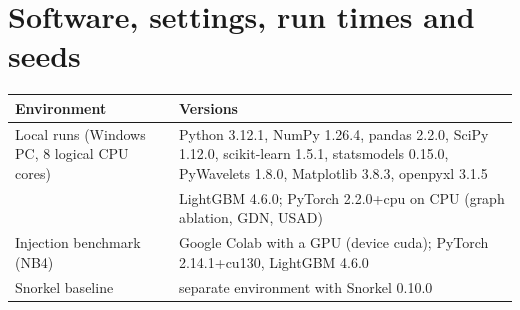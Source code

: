 \documentclass[11pt,a4paper]{article}
\makeatletter
\newenvironment{stable}{\par\addvspace{8pt}\noindent\begin{minipage}{\textwidth}\def\@captype{table}\centering}{\end{minipage}\par\addvspace{8pt}}
\makeatother
\begin{document}
\section{Software, settings, run times and seeds}\label{sec:s-repro}
\begin{stable}
\caption{Software and hardware. The versions of the local environment were read on 15 November 2026; each run records the versions it used in its \texttt{summary.json}. LightGBM is pinned at 4.6.0 (4.7.0 crashed on the local machine).}\label{tab:s-software}
\footnotesize\setlength{\tabcolsep}{4pt}
\begin{tabular}{@{}>{\raggedright\arraybackslash}p{4.6cm} >{\raggedright\arraybackslash}p{10.6cm}@{}}
\toprule
Environment & Versions \\
\midrule
Local runs (Windows PC, 8 logical CPU cores) & Python 3.12.1, NumPy 1.26.4, pandas 2.2.0, SciPy 1.12.0, scikit-learn 1.5.1, statsmodels 0.15.0, PyWavelets 1.8.0, Matplotlib 3.8.3, openpyxl 3.1.5 \\
 & LightGBM 4.6.0; PyTorch 2.2.0+cpu on CPU (graph ablation, GDN, USAD) \\
Injection benchmark (NB4) & Google Colab with a GPU (device cuda); PyTorch 2.14.1+cu130, LightGBM 4.6.0 \\
Snorkel baseline & separate environment with Snorkel 0.10.0 \\
\bottomrule
\end{tabular}
\end{stable}
\end{document}
